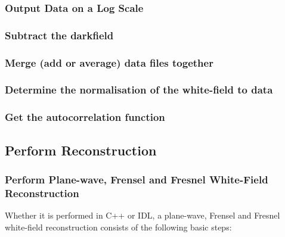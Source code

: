 \documentclass[]{nadia}
\begin{document}
\subsubsection{Output Data on a Log Scale}

\subsubsection{Subtract the darkfield}

\subsubsection{Merge (add or average) data files together}

\subsubsection{Determine the normalisation of the white-field to data}

\subsubsection{Get the autocorrelation function}


\subsection{Perform Reconstruction}

\subsubsection{Perform Plane-wave, Frensel and Fresnel White-Field Reconstruction}
\label{subsubsec:rec}

Whether it is performed in C++ or IDL, a plane-wave, Frensel and
Fresnel white-field reconstruction consists of the following basic
steps:
\end{document}
